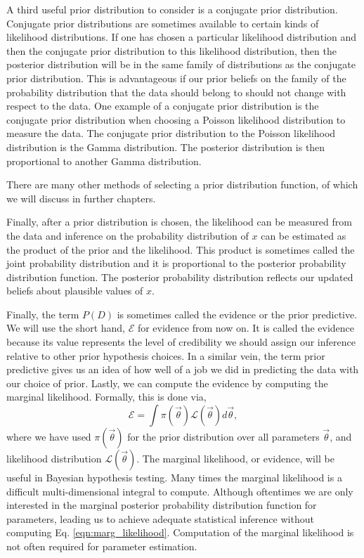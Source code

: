 A third useful prior distribution to consider is a conjugate prior distribution. Conjugate prior distributions are sometimes available to certain kinds of likelihood distributions. If one has chosen a particular likelihood distribution and then the conjugate prior distribution to this likelihood distribution, then the posterior distribution will be in the same family of distributions as the conjugate prior distribution. This is advantageous if our prior beliefs on the family of the probability distribution that the data should belong to should not change with respect to the data. One example of a conjugate prior distribution is the conjugate prior distribution when choosing a Poisson likelihood distribution to measure the data. The conjugate prior distribution to the Poisson likelihood distribution is the Gamma distribution. The posterior distribution is then proportional to another Gamma distribution.

There are many other methods of selecting a prior distribution function, of which we will discuss in further chapters.

Finally, after a prior distribution is chosen, the likelihood can be measured from the data and inference on the probability distribution of $x$ can be estimated as the product of the prior and the likelihood. This product is sometimes called the joint probability distribution and it is proportional to the posterior probability distribution function. The posterior probability distribution reflects our updated beliefs about plausible values of $x$.

Finally, the term $P(D)$ is sometimes called the evidence or the prior predictive. We will use the short hand, $\mathcal{E}$ for evidence from now on. It is called the evidence because its value represents the level of credibility we should assign our inference relative to other prior hypothesis choices. In a similar vein, the term prior predictive gives us an idea of how well of a job we did in predicting the data with our choice of prior. Lastly, we can compute the evidence by computing the marginal likelihood. Formally, this is done via,
\begin{equation}\label{eqn:marg_likelihood}
    \mathcal{E} = \int \pi(\vec{\theta}) \mathcal{L}(\vec{\theta}) d\vec{\theta},
\end{equation}
where we have used $\pi(\vec{\theta})$ for the prior distribution over all parameters $\vec{\theta}$, and likelihood distribution $\mathcal{L}(\vec{\theta})$. The marginal likelihood, or evidence, will be useful in Bayesian hypothesis testing. Many times the marginal likelihood is a difficult multi-dimensional integral to compute. Although oftentimes we are only interested in the marginal posterior probability distribution function for parameters, leading us to achieve adequate statistical inference without computing Eq. \ref{eqn:marg_likelihood}. Computation of the marginal likelihood is not often required for parameter estimation.

